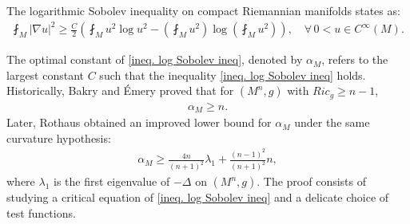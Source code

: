 \documentclass[11pt]{amsart}
\numberwithin{equation}{section}
\numberwithin{lemma}{section}
\numberwithin{proposition}{section}
\numberwithin{corollary}{section}
\numberwithin{remark}{section}
\begin{document}
    The logarithmic Sobolev inequality on compact Riemannian manifolds states as:
    \begin{align}\label{ineq. log Sobolev ineq}
        \fint_M |\nabla u|^2\geq
        \frac{C}{2}\left(
        \fint_M u^2\log u^2
        -\left(\fint_M u^2\right)
        \log\left(\fint_M u^2\right)
        \right),\quad \forall\, 0<u\in C^{\infty}(M).
    \end{align}
   
    
    The optimal constant of \cref{ineq. log Sobolev ineq}, denoted by $\alpha_M$, refers to the largest constant $C$ such that the inequality \cref{ineq. log Sobolev ineq} holds.
     Historically, Bakry and \'{E}mery \cite{BE06} proved that for $(M^n,g)$ with $Ric_g\geq n-1$, 
     \begin{align*}
         \alpha_M\geq  n.
     \end{align*}
     Later, Rothaus \cite[Theorem 1]{Rot86} obtained an improved lower bound for $\alpha_M$ under the same curvature hypothesis:
     \begin{align}\label{ineq. Rothaus}
         \alpha_M \geq 
         \frac{4n}{(n+1)^2}\lambda_1
         +\frac{(n-1)^2}{(n+1)^2}n
         ,
     \end{align}
     where $\lambda_1$ is the first eigenvalue of $-\Delta$ on $(M^n,g)$. The proof  consists of studying a critical equation of \cref{ineq. log Sobolev ineq} and a delicate choice of test functions.
     
    
\end{document}
